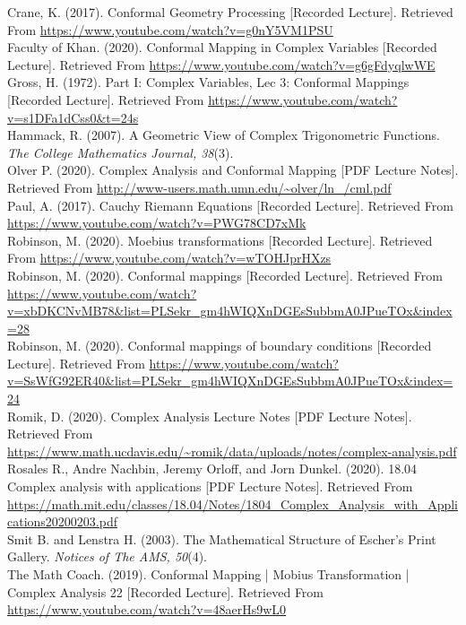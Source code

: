\documentclass[a4paper,man,natbib]{apa6}
\begin{document}
      Crane, K. (2017). Conformal Geometry Processing [Recorded Lecture]. Retrieved From
\url{https://www.youtube.com/watch?v=g0nY5VM1PSU}
\\
      Faculty of Khan. (2020). Conformal Mapping in Complex Variables [Recorded Lecture]. Retrieved From
\url{https://www.youtube.com/watch?v=g6gFdyqlwWE}
\\
      Gross, H. (1972). Part I: Complex Variables, Lec 3: Conformal Mappings [Recorded Lecture]. Retrieved From
\url{https://www.youtube.com/watch?v=s1DFa1dCss0&t=24s}
\\
      Hammack, R. (2007). A Geometric View of Complex Trigonometric Functions. \textit{The College Mathematics Journal, 38}(3).
\\
      Olver P. (2020). Complex Analysis and Conformal Mapping [PDF Lecture Notes]. Retrieved From
\url{http://www-users.math.umn.edu/~olver/ln_/cml.pdf}
\\
      Paul, A. (2017). Cauchy Riemann Equations [Recorded Lecture]. Retrieved From
\url{https://www.youtube.com/watch?v=PWG78CD7xMk}
\\
      Robinson, M. (2020). Moebius transformations [Recorded Lecture]. Retrieved From
\url{https://www.youtube.com/watch?v=wTOHJprHXzs}
\\
      Robinson, M. (2020). Conformal mappings [Recorded Lecture]. Retrieved From
\url{https://www.youtube.com/watch?v=xbDKCNvMB78&list=PLSekr_gm4hWIQXnDGEsSubbmA0JPueTOx&index=28}
\\
      Robinson, M. (2020). Conformal mappings of boundary conditions [Recorded Lecture]. Retrieved From
\url{https://www.youtube.com/watch?v=SsWfG92ER40&list=PLSekr_gm4hWIQXnDGEsSubbmA0JPueTOx&index=24}
\\
      Romik, D. (2020). Complex Analysis Lecture Notes [PDF Lecture Notes]. Retrieved From
\url{https://www.math.ucdavis.edu/~romik/data/uploads/notes/complex-analysis.pdf}
\\
      Rosales R., Andre Nachbin, Jeremy Orloff, and Jorn Dunkel. (2020). 18.04 Complex analysis with applications [PDF Lecture Notes]. Retrieved From
\url{https://math.mit.edu/classes/18.04/Notes/1804_Complex_Analysis_with_Applications20200203.pdf}
\\
      Smit B. and Lenstra H. (2003). The Mathematical Structure of Escher’s Print Gallery. \textit{Notices of The AMS, 50}(4).
\\
      The Math Coach. (2019). Conformal Mapping | Mobius Transformation | Complex Analysis 22 [Recorded Lecture]. Retrieved From
\url{https://www.youtube.com/watch?v=48aerHs9wL0}
\end{document}
